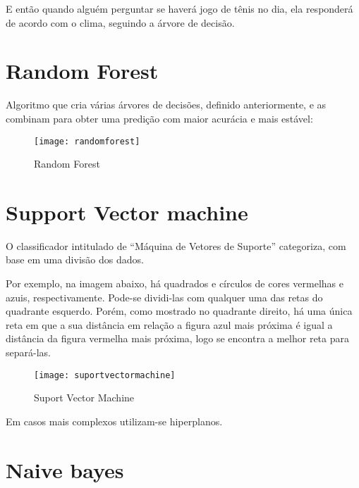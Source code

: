 E então quando alguém perguntar se haverá jogo de tênis no dia, ela responderá de acordo com o clima, seguindo a árvore de decisão.

\section{\textbf{Random Forest}}

Algoritmo que cria várias árvores de decisões, definido anteriormente, e as combinam para obter uma predição com maior acurácia e mais estável:



\begin{figure}[!htb]
\begin{center}
\caption{Random Forest}
\texttt{[image: randomforest]}
\end{center}
\cite{RANDOMFOREST}
\end{figure}



\section{\textbf{Support Vector machine}}

O classificador intitulado de “Máquina de Vetores de Suporte” categoriza, com base em uma divisão dos dados.  

Por exemplo, na imagem abaixo, há quadrados e círculos de cores vermelhas e azuis, respectivamente. 
Pode-se dividi-las com qualquer uma das retas do quadrante esquerdo. 
Porém, como mostrado no quadrante direito, 
há uma única reta em que a sua distância em relação a figura azul mais próxima é igual a distância da figura vermelha mais próxima, 
logo se encontra a melhor reta para separá-las.


\begin{figure}[!htb]
\begin{center}
\caption{Suport Vector Machine}
\texttt{[image: suportvectormachine]}
\end{center}
\cite{SVM}
\end{figure}

Em casos mais complexos utilizam-se hiperplanos.


\section{\textbf{Naive bayes}}

